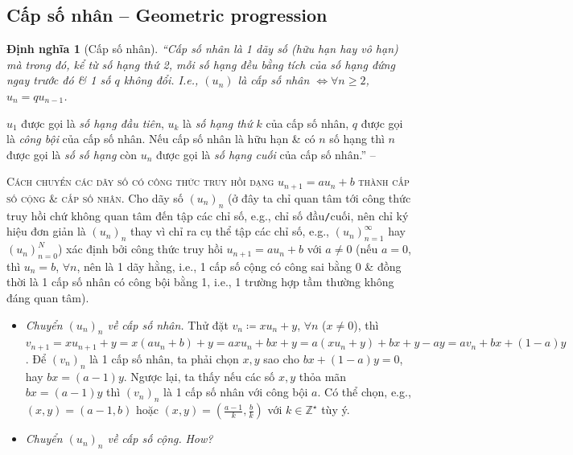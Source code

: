 \documentclass[oneside]{book}
\numberwithin{equation}{section}
\newtheorem{dinhnghia}{Định nghĩa}[section]
\begin{document}
\subsection{Cấp số nhân -- Geometric progression}

\begin{dinhnghia}[Cấp số nhân]
	``\emph{Cấp số nhân} là 1 dãy số (hữu hạn hay vô hạn) mà trong đó, kể từ số hạng thứ 2, mỗi số hạng đều bằng tích của số hạng đứng ngay trước đó \& 1 số $q$ không đổi. I.e., $(u_n)$ là cấp số nhân $\Leftrightarrow\forall n\ge 2$, $u_n = qu_{n-1}$.
\end{dinhnghia}
$u_1$ được gọi là \textit{số hạng đầu tiên}, $u_k$ là \textit{số hạng thứ $k$} của cấp số nhân, $q$ được gọi là \textit{công bội} của cấp số nhân. Nếu cấp số nhân là hữu hạn \& có $n$ số hạng thì $n$ được gọi là \textit{số số hạng} còn $u_n$ được gọi là \textit{số hạng cuối} của cấp số nhân.'' -- \cite[p. 128]{TL_chuyen_Toan_Dai_So_Giai_Tich_11}

\textsc{Cách chuyển các dãy số có công thức truy hồi dạng $u_{n+1} = au_n + b$ thành cấp số cộng \& cấp số nhân.} Cho dãy số $(u_n)_n$ (ở đây ta chỉ quan tâm tới công thức truy hồi chứ không quan tâm đến tập các chỉ số, e.g., chỉ số đầu\texttt{/}cuối, nên chỉ ký hiệu đơn giản là $(u_n)_n$ thay vì chỉ ra cụ thể tập các chỉ số, e.g., $(u_n)_{n=1}^\infty$ hay $(u_n)_{n=0}^N$) xác định bởi công thức truy hồi $u_{n+1} = au_n + b$ với $a\ne 0$ (nếu $a = 0$, thì $u_n = b$, $\forall n$, nên là 1 dãy hằng, i.e., 1 cấp số cộng có công sai bằng 0 \& đồng thời là 1 cấp số nhân có công bội bằng 1, i.e., 1 trường hợp tầm thường không đáng quan tâm).
\begin{itemize}
	\item \textit{Chuyển $(u_n)_n$ về cấp số nhân.} Thử đặt $v_n\coloneqq xu_n + y$, $\forall n$ ($x\ne 0$), thì $v_{n+1} = xu_{n+1} + y = x(au_n + b) + y = axu_n + bx + y = a(xu_n + y) + bx + y - ay = av_n + bx + (1 - a)y$. Để $(v_n)_n$ là 1 cấp số nhân, ta phải chọn $x,y$ sao cho $bx + (1 - a)y = 0$, hay $bx = (a - 1)y$. Ngược lại, ta thấy nếu các số $x,y$ thỏa mãn $bx = (a - 1)y$ thì $(v_n)_n$ là 1 cấp số nhân với công bội $a$. Có thể chọn, e.g., $(x,y) = (a - 1,b)$ hoặc $(x,y) = \left(\frac{a - 1}{k},\frac{b}{k}\right)$ với $k\in\mathbb{Z}^\star$ tùy ý.
	\item \textit{Chuyển $(u_n)_n$ về cấp số cộng.} \textit{How?}
\end{itemize}

\end{document}
